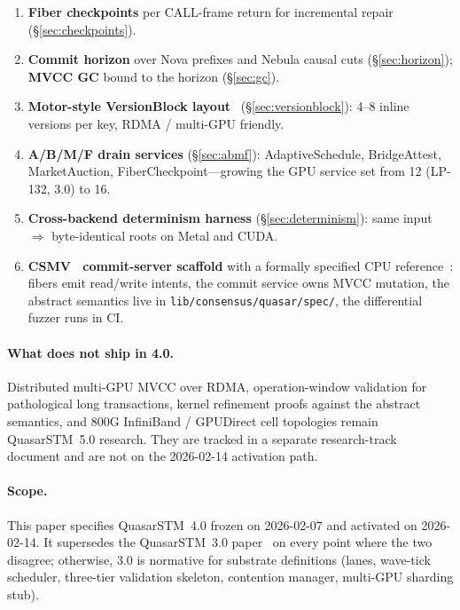 \begin{enumerate}[leftmargin=2em]
      (\S\ref{sec:multiverse}): \texttt{SingleVersionFast},
      \texttt{MultiVersion}, \texttt{Reducer}, \texttt{Serialized}
      modes selected per lane between rounds.
\item \textbf{Fiber checkpoints} per CALL-frame return for incremental
      repair (\S\ref{sec:checkpoints}).
\item \textbf{Commit horizon} over Nova prefixes and Nebula causal cuts
      (\S\ref{sec:horizon}); \textbf{MVCC GC} bound to the horizon
      (\S\ref{sec:gc}).
\item \textbf{Motor-style VersionBlock layout}~\cite{motor2024}
      (\S\ref{sec:versionblock}): 4--8 inline versions per key, RDMA /
      multi-GPU friendly.
\item \textbf{A/B/M/F drain services} (\S\ref{sec:abmf}):
      AdaptiveSchedule, BridgeAttest, MarketAuction,
      FiberCheckpoint---growing the GPU service set from 12 (LP-132,
      3.0) to 16.
\item \textbf{Cross-backend determinism harness}
      (\S\ref{sec:determinism}): same input $\Rightarrow$ byte-identical
      roots on Metal and CUDA.
\item \textbf{CSMV~\cite{csmv} commit-server scaffold} with a formally
      specified CPU reference~\cite{vmvcc}: fibers emit read/write
      intents, the commit service owns MVCC mutation, the abstract
      semantics live in \texttt{lib/consensus/quasar/spec/}, the
      differential fuzzer runs in CI.
\end{enumerate}

\paragraph{What does not ship in 4.0.}
Distributed multi-GPU MVCC over RDMA, operation-window validation for
pathological long transactions, kernel refinement proofs against the
abstract semantics, and 800G InfiniBand / GPUDirect cell topologies
remain QuasarSTM~5.0 research. They are tracked in a separate
research-track document and are not on the 2026-02-14 activation path.

\paragraph{Scope.}
This paper specifies QuasarSTM~4.0 frozen on 2026-02-07 and activated
on 2026-02-14. It supersedes the QuasarSTM~3.0 paper~\cite{lp010-quasarstm-3}
on every point where the two disagree; otherwise, 3.0 is normative for
substrate definitions (lanes, wave-tick scheduler, three-tier validation
skeleton, contention manager, multi-GPU sharding stub).

